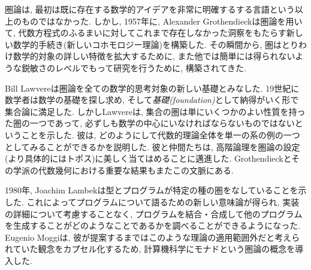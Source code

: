 圏論は, 最初は既に存在する数学的アイデアを非常に明確するする言語という以上のものではなかった. しかし, 1957年に, Alexander Grothendieckは圏論を用いて, 代数方程式のふるまいに対してこれまで存在しなかった洞察をもたらす新しい数学的手続き(新しいコホモロジー理論)を構築した. その瞬間から, 圏はとりわけ数学的対象の詳しい特徴を拡大するために, また他では簡単には得られないような鋭敏さのレベルでもって研究を行うために, 構築されてきた.


Bill Lawvereは圏論を全ての数学的思考対象の新しい基礎とみなした. 19世紀に数学者は数学の基礎を探し求め, そして\emph{基礎(foundation)}として納得がいく形で集合論に満足した. しかしLawvereは, 集合の圏は単にいくつかのよい性質を持った圏の一つであって, 必ずしも数学の中心にいなければならないものではないということを示した. 彼は, どのようにして代数的理論全体を単一の系の例の一つとしてみることができるかを説明した. 彼と仲間たちは, 高階論理を圏論の設定(より具体的にはトポス)に美しく当てはめることに邁進した. Grothendieckとその学派の代数幾何における重要な結果もまたこの文脈にある.


1980年, Joachim Lambekは型とプログラムが特定の種の圏をなしていることを示した. これによってプログラムについて語るための新しい意味論が得られ, 実装の詳細について考慮することなく, プログラムを結合・合成して他のプログラムを生成することがどのようなことであるかを調べることができるようになった. Eugenio Moggiは, 彼が提案するまではこのような理論の適用範囲外だと考えられていた観念をカプセル化するため, 計算機科学にモナドという圏論の概念を導入した.

